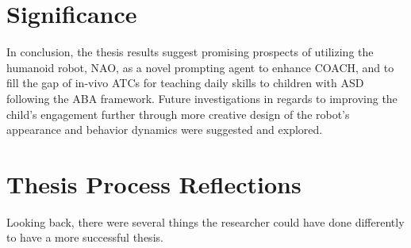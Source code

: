 \documentclass{ut-thesis}
\begin{document}

\section{Significance}
In conclusion, the thesis results suggest promising prospects of utilizing the humanoid robot, NAO, as a novel prompting agent to enhance COACH, and to fill the gap of in-vivo ATCs for teaching daily skills to children with ASD following the ABA framework.  Future investigations in regards to improving the child's engagement further through more creative design of the robot's appearance and behavior dynamics were suggested and explored.

\section{Thesis Process Reflections}
Looking back, there were several things the researcher could have done differently to have a more successful thesis.
\end{document}
